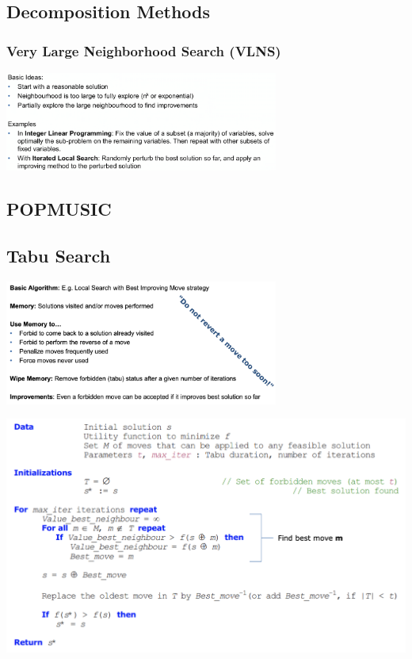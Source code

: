 \documentclass[10pt,a4paper,twocolumn]{article}
\begin{document}
\subsection{Decomposition Methods}
\subsubsection{Very Large Neighborhood Search (VLNS)}
\begin{center}
\includegraphics[width=9cm]{images/vlns}
\end{center}

\subsection{POPMUSIC}

\subsection{Tabu Search}
\begin{center}
\includegraphics[width=9cm]{images/tabu-search1}
\end{center}


\begin{center}
\includegraphics[width=1.2\linewidth]{images/tabu-search3}
\end{center}
\end{document}
